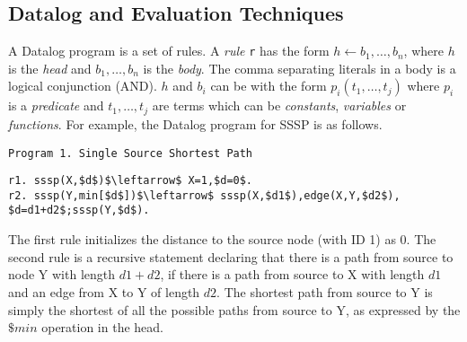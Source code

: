 
\subsection{Datalog and Evaluation Techniques}

A Datalog program is a set of rules. A \emph{rule} \texttt{r} has the form $h\leftarrow b_1,\ldots,b_n$, where $h$ is the \emph{head} and $b_1,\ldots,b_n$ is the \emph{body}. The comma separating literals in a body is a logical conjunction (AND). $h$ and $b_i$ can be with the form $p_i(t_1,\ldots,t_j)$ where $p_i$ is a \emph{predicate} and $t_1,\ldots,t_j$ are terms which can be \emph{constants}, \emph{variables} or \emph{functions}. For example, the Datalog program for SSSP is as follows.
\begin{verbatim}
Program 1. Single Source Shortest Path
\end{verbatim}
\vspace{-0.1in}
\small
\begin{lstlisting}
r1. sssp(X,$d$)$\leftarrow$ X=1,$d=0$.
r2. sssp(Y,min[$d$])$\leftarrow$ sssp(X,$d1$),edge(X,Y,$d2$),
$d=d1+d2$;sssp(Y,$d$).
\end{lstlisting}
\normalsize
The first rule initializes the distance to the source node (with ID 1) as 0. The second rule is a recursive statement declaring that there is a path from source to node Y with length $d1+d2$, if there is a path from source to X with length $d1$ and an edge from X to Y of length $d2$. The shortest path from source to Y is simply the shortest of all the possible paths from source to Y, as expressed by the $\$min$ operation in the head.  

